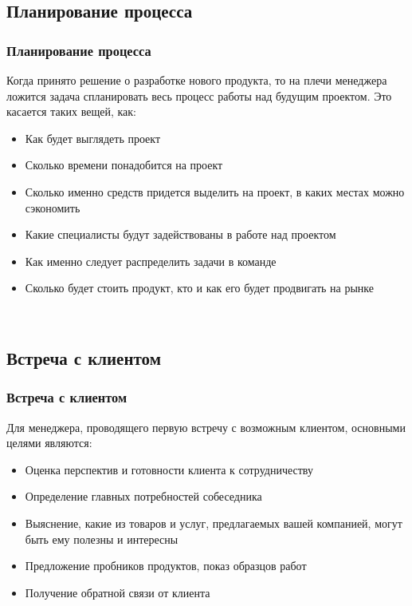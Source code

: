 \documentclass{../industrial-development}
\begin{document}
{\subsection{Планирование процесса}
\begin{frame} \frametitle{Планирование процесса}
Когда принято решение о разработке нового продукта, то на плечи менеджера ложится задача спланировать весь процесс работы над будущим проектом. Это касается таких вещей, как:
\begin{itemize}	
		\item Как будет выглядеть проект
		\item Сколько времени понадобится на проект
	 	\item Сколько именно средств придется выделить на проект, в каких местах можно сэкономить
	 	\item Какие специалисты будут задействованы в работе над проектом
		\item Как именно следует распределить задачи в команде
	 	\item Сколько будет стоить продукт, кто и как его будет продвигать на рынке

 \end{itemize}
\end{frame}
\lecturenotes

~\cite{How_to_be_a_good_IT-manager}

\subsection{Встреча с клиентом}
\begin{frame} \frametitle{Встреча с клиентом}
Для менеджера, проводящего первую встречу с возможным клиентом, основными целями являются:
\begin{itemize}	
		\item Оценка перспектив и готовности клиента к сотрудничеству
		\item Определение главных потребностей собеседника
	 	\item Выяснение, какие из товаров и услуг, предлагаемых вашей компанией, могут быть ему полезны и интересны
	 	\item Предложение пробников продуктов, показ образцов работ
		\item Получение обратной связи от клиента

 \end{itemize}
\end{frame}
\lecturenotes

~\cite{How_to_be_a_good_IT-manager}

}
\end{document}
